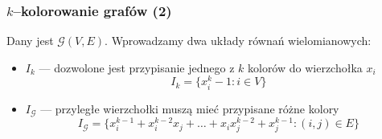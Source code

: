 \documentclass[10pt]{beamer}
\begin{document}
\begin{frame}
    \frametitle{$k$--kolorowanie grafów (2)}

    Dany jest $\mathcal{G}(V, E)$. Wprowadzamy dwa układy równań wielomianowych:
    \begin{itemize}
        \item<2-> $I_k$ --- dozwolone jest przypisanie jednego z $k$ kolorów do wierzchołka $x_i$
            \begin{equation*}
                I_k = \{ x_i^k - 1 : i \in V \}
            \end{equation*}
        \item<3-> $I_{\mathcal{G}}$ --- przyległe wierzchołki muszą mieć przypisane różne kolory
            \begin{equation*}
                I_{\mathcal{G}} = \{ x_{i}^{k-1} + x_{i}^{k-2} x_{j} + \ldots + x_{i} x_{j}^{k-2} + x_{j}^{k-1} : (i, j) \in E \}
            \end{equation*}
    \end{itemize}
\end{frame}
\end{document}
